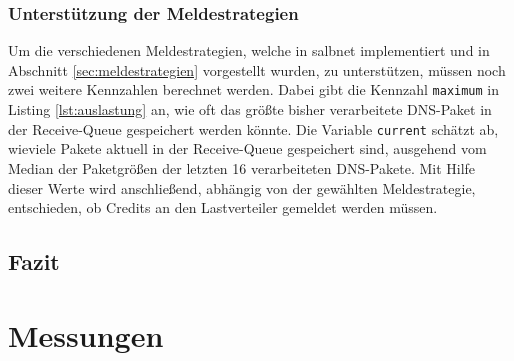 \documentclass[a4paper, 12pt, BCOR10mm, DIV12, toc=bibliography, toc=listof, german]{scrbook}
\begin{document}
			
			
			
			

			\subsection*{Unterstützung der Meldestrategien} %

			Um die verschiedenen Meldestrategien, welche in salbnet implementiert und in Abschnitt
			\ref{sec:meldestrategien} vorgestellt wurden, zu unterstützen, müssen noch zwei weitere
			Kennzahlen berechnet werden. Dabei gibt die Kennzahl \texttt{maximum} in Listing
			\ref{lst:auslastung} an, wie oft das größte bisher verarbeitete DNS-Paket in der Receive-Queue
			gespeichert werden könnte. Die Variable \texttt{current} schätzt ab, wieviele Pakete aktuell
			in der Receive-Queue gespeichert sind, ausgehend vom Median der Paketgrößen der letzten 16
			verarbeiteten DNS-Pakete.  Mit Hilfe dieser Werte wird anschließend, abhängig von der
			gewählten Meldestrategie, entschieden, ob Credits an den Lastverteiler gemeldet werden müssen.

			



		\section{Fazit} %
		\label{sec:implementierung-fazit}
		


	\chapter{Messungen} %
	\label{cha:messungen}
\end{document}
